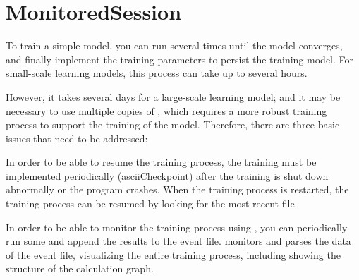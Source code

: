 \begin{savequote}[45mm]
\end{savequote}

\chapter{MonitoredSession} 
\label{ch:monitored-session}

\begin{content}

To train a simple model, you can run  several times until the model converges, and finally implement the training parameters  to persist the training model. For small-scale learning models, this process can take up to several hours.

However, it takes several days for a large-scale learning model; and it may be necessary to use multiple copies of , which requires a more robust training process to support the training of the model. Therefore, there are three basic issues that need to be addressed:

\begin{enum}
\end{enum}

In order to be able to resume the training process, the training must be implemented periodically (ascii{Checkpoint}) after the training is shut down abnormally or the program crashes. When the training process is restarted, the training process can be resumed by looking for the most recent  file.

In order to be able to monitor the training process using , you can periodically run some  and append the results to the event file.  monitors and parses the data of the event file, visualizing the entire training process, including showing the structure of the calculation graph.

\end{content}

